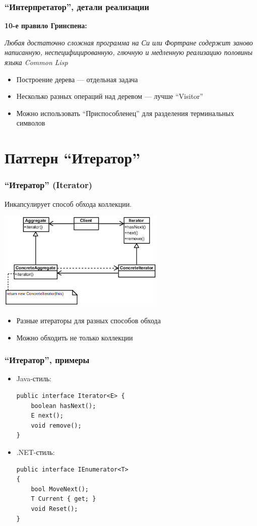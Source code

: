 \documentclass[xetex,mathserif,serif]{beamer}
\begin{document}
	\begin{frame}
		\frametitle{``Интерпретатор'', детали реализации}
		\begin{footnotesize}
			\textbf{10-е правило Гринспена:}
			
			\textit{Любая достаточно сложная программа на Си или Фортране содержит заново написанную, неспецифицированную, глючную и медленную реализацию половины языка Common Lisp}
		\end{footnotesize}
		\begin{itemize}
			\item Построение дерева --- отдельная задача
			\item Несколько разных операций над деревом --- лучше ``Visitor''
			\item Можно использовать ``Приспособленец'' для разделения терминальных символов
		\end{itemize}
	\end{frame}

	\section{Паттерн ``Итератор''}

	\begin{frame}
		\frametitle{``Итератор'' (Iterator)}
		Инкапсулирует способ обхода коллекции.
		\begin{center}
			\includegraphics[width=0.6\textwidth]{iterator.png}
		\end{center}
		\begin{itemize}
			\item Разные итераторы для разных способов обхода
			\item Можно обходить не только коллекции
		\end{itemize}
	\end{frame}

	\begin{frame}[fragile]
		\frametitle{``Итератор'', примеры}
		\begin{itemize}
			\item Java-стиль:
			\begin{verbatim}
public interface Iterator<E> {
    boolean hasNext();
    E next();
    void remove();
}
			\end{verbatim}
			\item .NET-стиль:
			\begin{verbatim}
public interface IEnumerator<T>
{
    bool MoveNext();
    T Current { get; }
    void Reset();
}
			\end{verbatim}
		\end{itemize}
	\end{frame}
\end{document}
